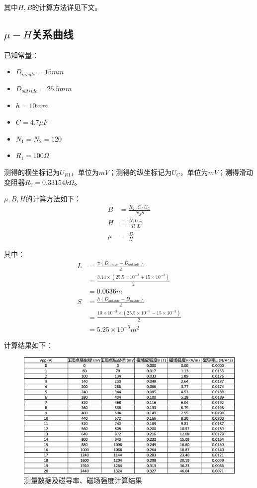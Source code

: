\documentclass{article}
\begin{document}
其中$H, B$的计算方法详见下文。

\subsection{$\mu-H$关系曲线}
已知常量：
\begin{itemize}
    \item $D_{inside} = 15 mm$
    \item $D_{outside} = 25.5 mm$
    \item $h = 10 mm$
    \item $C = 4.7 \mu F$
    \item $N_1 = N_2 = 120$
    \item $R_1 = 100 \Omega$
\end{itemize}
测得的横坐标记为$U_{R1}$，单位为$mV$；测得的纵坐标记为$U_C$，单位为$mV$；测得滑动变阻器$R_2 = 0.33154 k\Omega$。

$\mu, B, H$的计算方法如下：
\begin{align*}
    B &= \frac{R_2 \cdot C \cdot U_C}{N_2 S} \\
    H &= \frac{N_1 U_{R1}}{R_1 L} \\
    \mu &= \frac{B}{H}
\end{align*}

其中：
\begin{align*}
    L &= \frac{\pi (D_{inside} + D_{outside})}{2} \\
    &= \frac{3.14 \times (25.5 \times 10^{-3} + 15 \times 10^{-3})}{2} \\
    &= 0.0636 m \\
    S &= \frac{h (D_{outside} - D_{inside})}{2} \\
    &= \frac{10\times 10^{-3} \times (25.5 \times 10^{-3} - 15 \times 10^{-3})}{2} \\
    &= 5.25 \times 10^{-5} m^2
\end{align*}

计算结果如下：
\begin{figure}[htbp]
    \centering
    \includegraphics[width=1.0\textwidth]{data1.png}
    \caption{测量数据及磁导率、磁场强度计算结果}
\end{figure}
\end{document}
